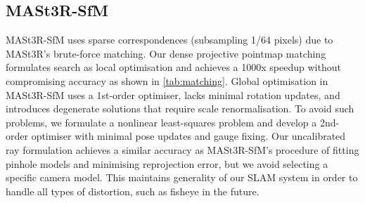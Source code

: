 \subsection{MASt3R-SfM}

MASt3R-SfM uses sparse correspondences (subsampling 1/64 pixels) due to MASt3R's brute-force matching.  Our dense projective pointmap matching formulates search as local optimisation and achieves a 1000x speedup without compromising accuracy as shown in \cref{tab:matching}. Global optimisation in MASt3R-SfM uses a 1st-order optimiser, lacks minimal rotation updates, and introduces degenerate solutions that require scale renormalisation.
To avoid such problems, we formulate a nonlinear least-squares problem and develop a 2nd-order optimiser with minimal pose updates and gauge fixing.
Our uncalibrated ray formulation achieves a similar accuracy as MASt3R-SfM's procedure of fitting pinhole models and minimising reprojection error, but we avoid selecting a specific camera model. This maintains generality of our SLAM system in order to handle all types of distortion, such as fisheye in the future.

